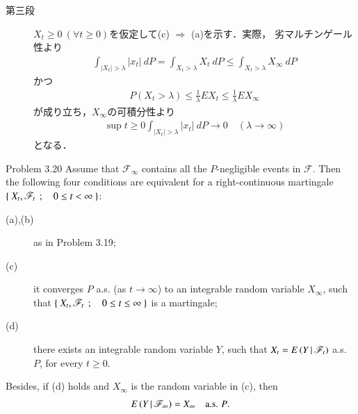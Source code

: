 \begin{prf}
\begin{description}
			\item[第三段]
				$X_t \geq 0\ (\forall t \geq 0)$を仮定して(c) $\Rightarrow$ (a)を示す．実際，
				劣マルチンゲール性より
				\begin{align}
					\int_{|X_t| > \lambda} |x_t|\ dP
					= \int_{X_t > \lambda} X_t\ dP
					\leq \int_{X_t > \lambda} X_\infty\ dP
				\end{align}
				かつ
				\begin{align}
					P\left( X_t > \lambda \right)
					\leq \frac{1}{\lambda} EX_t
					\leq \frac{1}{\lambda} EX_\infty
				\end{align}
				が成り立ち，$X_\infty$の可積分性より
				\begin{align}
					\sup{t \geq 0}{\int_{|X_t| > \lambda} |x_t|\ dP} 
					\longrightarrow 0
					\quad (\lambda \longrightarrow \infty)
				\end{align}
				となる．
				\QED
		\end{description}
	\end{prf}
	
	\begin{itembox}[l]{Problem 3.20}
		Assume that $\mathscr{F}_\infty$ contains all the $P$-negligible events in $\mathscr{F}$.
		Then the following four conditions are equivalent for a right-continuous martingale
		$\left\{\ X_t,\mathscr{F}_t\ \, ; \quad 0 \leq t < \infty\ \right\}$:
		\begin{description}
			\item[(a),(b)] as in Problem 3.19;
			\item[(c)] it converges $P$ a.s. (as $t \to \infty$) to an integrable random variable $X_\infty$,
				such that $\left\{\ X_t,\mathscr{F}_t\ \, ; \quad 0 \leq t \leq \infty\ \right\}$ is a martingale;
			\item[(d)] there exists an integrable random variable $Y$, such that $X_t = E\left( Y \, \middle|\, \mathscr{F}_t \right)$ a.s. $P$,
				for every $t \geq 0$.
		\end{description}
		Besides, if (d) holds and $X_\infty$ is the random variable in (c), then
		\begin{align}
			E\left( Y \, \middle|\, \mathscr{F}_\infty \right) = X_\infty
			\quad \mbox{a.s. $P$}.
			\label{eq:chapter_1_Problem_3_20_1}
		\end{align}
	\end{itembox}
	
